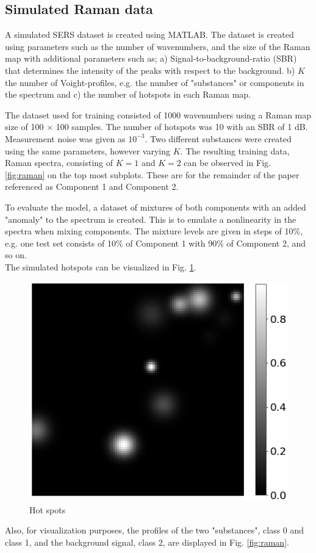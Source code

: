 \documentclass{article}
\begin{document}
\subsection{Simulated Raman data}
A simulated SERS dataset is created using MATLAB. The dataset is created using parameters such as the number of wavenumbers, and the size of the Raman map with additional parameters such as; a) Signal-to-background-ratio (SBR) that determines the intensity of the peaks with respect to the background. b) $K$ the number of Voight-profiles, e.g. the number of "substances" or components in the spectrum and c) the number of hotspots in each Raman map.

The dataset used for training consisted of 1000 wavenumbers using a Raman map size of 100 $\times$ 100 samples. The number of hotspots was 10 with an SBR of 1 dB. Measurement noise was given as $10^{-3}$. Two different substances were created using the same parameters, however varying $K$. The resulting training data, Raman spectra, consisting of $K=1$ and $K=2$ can be observed in Fig. \ref{fig:raman} on the top most subplots. These are for the remainder of the paper referenced as Component 1 and Component 2.

To evaluate the model, a dataset of mixtures of both components with an added "anomaly" to the spectrum is created. This is to emulate a nonlinearity in the spectra when mixing components. The mixture levels are given in steps of 10\%, e.g. one test set consists of 10\% of Component 1 with 90\% of Component 2, and so on.\\
The simulated hotspots can be visualized in Fig. \ref{fig:hotspots}.

\begin{figure}[H]
    \centering
\includegraphics[width=0.5\linewidth]{figures_3/raman_sim_hotspots.png}  
\caption{Hot spots}
\label{fig:hotspots}
\end{figure}

Also, for visualization purposes, the profiles of the two "substances", class 0 and class 1, and the background signal, class 2, are displayed in Fig. \ref{fig:raman}.
\end{document}
